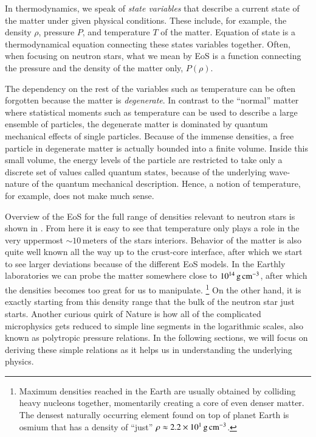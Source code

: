 In thermodynamics, we speak of \emph{state variables} that describe a current state of the matter under given physical conditions.
These include, for example, the density $\rho$, pressure $P$, and temperature $T$ of the matter.
Equation of state is a thermodynamical equation connecting these states variables together.
Often, when focusing on neutron stars, what we mean by EoS is a function connecting the pressure and the density of the matter only, $P(\rho)$.

The dependency on the rest of the variables such as temperature can be often forgotten because the matter is \emph{degenerate}.%
In contrast to the ``normal'' matter where statistical moments such as temperature can be used to describe a large ensemble of particles, the degenerate matter is dominated by quantum mechanical effects of single particles.
Because of the immense densities, a free particle in degenerate matter is actually bounded into a finite volume.
Inside this small volume, the energy levels of the particle are restricted to take only a discrete set of values called quantum states, because of the underlying wave-nature of the quantum mechanical description.
Hence, a notion of temperature, for example, does not make much sense.

Overview of the EoS for the full range of densities relevant to neutron stars is shown in .
From here it is easy to see that temperature only plays a role in the very uppermost $\sim 10\,\mathrm{meters}$ of the stars interiors.
Behavior of the matter is also quite well known all the way up to the crust-core interface, after which we start to see larger deviations because of the different EoS models.
In the Earthly laboratories we can probe the matter somewhere close to $10^{14} \, \mathrm{g}\,\mathrm{cm}^{-3}$, after which the densities becomes too great for us to manipulate.%
\footnote{Maximum densities reached in the Earth are usually obtained by colliding heavy nucleons together, momentarily creating a core of even denser matter.
The densest naturally occurring element found on top of planet Earth is osmium that has a density of ``just'' $\rho \approx 2.2 \times 10^{1}\, \mathrm{g}\,\mathrm{cm}^{-3}$.
}
On the other hand, it is exactly starting from this density range that the bulk of the neutron star just starts.
Another curious quirk of Nature is how all of the complicated microphysics gets reduced to simple line segments in the logarithmic scales, also known as polytropic pressure relations.
In the following sections, we will focus on deriving these simple relations as it helps us in understanding the underlying physics.

